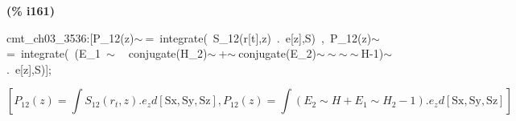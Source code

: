 \documentclass[fleqn]{article}
\begin{document}
\noindent
\begin{minipage}[t]{4.000000em}\color{red}\bfseries
(\% i161)	
\end{minipage}
\begin{minipage}[t]{\textwidth}\color{blue}
cmt\_ch03\_3536:[P\_12(z)\ensuremath{\sim\ }=\ integrate(\ S\_12(r[t],z)\ .\ e[z],S)\ ,\ P\_12(z)\ensuremath{\sim\ }=\ integrate(\ (E\_1\ \ensuremath{\sim\ }\ \ conjugate(H\_2)\ensuremath{\sim\ }+\ensuremath{\sim\ }conjugate(E\_2)\ensuremath{\sim\ }\ensuremath{\sim\ }\ensuremath{\sim\ }\ensuremath{\sim\ }H-1)\ensuremath{\sim\ }.\ e[z],S)];
\end{minipage}
\[\displaystyle \tag{cmt\_ ch03\_ 3536} 
\left[ {P_{\ensuremath{\mathrm{12}}}}(z)=\int {\left. {S_{\ensuremath{\mathrm{12}}}}\left( {r_t}\operatorname{,}z\right) \ensuremath{\mathrm{ . }}{e_z}d\left[ \ensuremath{\mathrm{Sx}}\operatorname{,}\ensuremath{\mathrm{Sy}}\operatorname{,}\ensuremath{\mathrm{Sz}}\right] \right.}\operatorname{,}{P_{\ensuremath{\mathrm{12}}}}(z)=\int {\left. \left( {E_2}\operatorname{\sim  }H+{E_1}\operatorname{\sim  }{H_2}-1\right) \ensuremath{\mathrm{ . }}{e_z}d\left[ \ensuremath{\mathrm{Sx}}\operatorname{,}\ensuremath{\mathrm{Sy}}\operatorname{,}\ensuremath{\mathrm{Sz}}\right] \right.}\right] \mbox{}
\]
\end{document}
